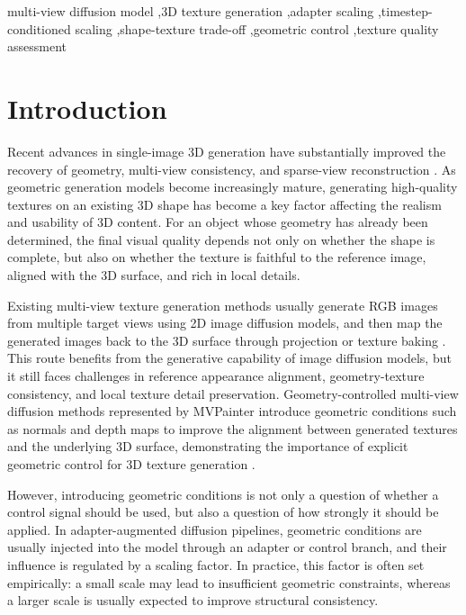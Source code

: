 \documentclass[times,twocolumn,final]{elsarticle}
\begin{document}
\begin{frontmatter}
\begin{keyword}
\KWD
multi-view diffusion model \sep 3D texture generation \sep adapter scaling \sep timestep-conditioned scaling \sep shape-texture trade-off \sep geometric control \sep texture quality assessment
\end{keyword}

\end{frontmatter}

\linenumbers

\section{Introduction}
\label{sec:intro}

Recent advances in single-image 3D generation have substantially improved the recovery of geometry, multi-view consistency, and sparse-view reconstruction \cite{liu2023zero1to3,shi2023zero123pp,liu2023syncdreamer,long2023wonder3d,shi2024mvdream,wang2023imagedream,xu2024instantmesh,ke2024era3d}. As geometric generation models become increasingly mature, generating high-quality textures on an existing 3D shape has become a key factor affecting the realism and usability of 3D content. For an object whose geometry has already been determined, the final visual quality depends not only on whether the shape is complete, but also on whether the texture is faithful to the reference image, aligned with the 3D surface, and rich in local details.

Existing multi-view texture generation methods usually generate RGB images from multiple target views using 2D image diffusion models, and then map the generated images back to the 3D surface through projection or texture baking \cite{chen2023text2tex,richardson2023texture,poole2023dreamfusion,chen2023fantasia3d}. This route benefits from the generative capability of image diffusion models, but it still faces challenges in reference appearance alignment, geometry-texture consistency, and local texture detail preservation. Geometry-controlled multi-view diffusion methods represented by MVPainter introduce geometric conditions such as normals and depth maps to improve the alignment between generated textures and the underlying 3D surface, demonstrating the importance of explicit geometric control for 3D texture generation \cite{shao2025mvpainter}.

However, introducing geometric conditions is not only a question of whether a control signal should be used, but also a question of how strongly it should be applied. In adapter-augmented diffusion pipelines, geometric conditions are usually injected into the model through an adapter or control branch, and their influence is regulated by a scaling factor. In practice, this factor is often set empirically: a small scale may lead to insufficient geometric constraints, whereas a larger scale is usually expected to improve structural consistency.
\end{document}
